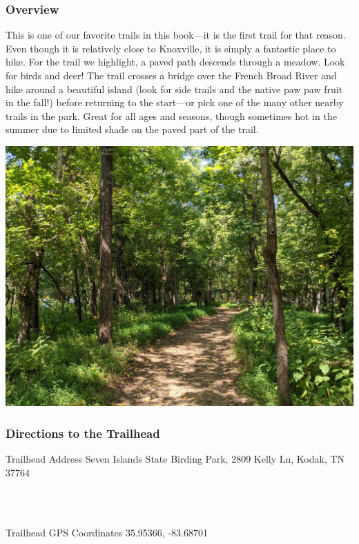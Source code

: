 \documentclass[
  letterpaper,
  DIV=11,
  numbers=noendperiod]{scrartcl}
\begin{document}
\hypertarget{overview}{%
\subsubsection{Overview}\label{overview}}

This is one of our favorite trails in this book---it is the first trail
for that reason. Even though it is relatively close to Knoxville, it is
simply a fantastic place to hike. For the trail we highlight, a paved
path descends through a meadow. Look for birds and deer! The trail
crosses a bridge over the French Broad River and hike around a beautiful
island (look for side trails and the native paw paw fruit in the fall!)
before returning to the start---or pick one of the many other nearby
trails in the park. Great for all ages and seasons, though sometimes hot
in the summer due to limited shade on the paved part of the trail.

\includegraphics{img/trail-01-figure-01.jpg}

\hypertarget{directions-to-the-trailhead}{%
\subsubsection{Directions to the
Trailhead}\label{directions-to-the-trailhead}}

Trailhead Address \textbar{} Seven Islands State Birding Park, 2809
Kelly Ln, Kodak, TN 37764 \textbar{}\\
\strut \\
\strut \\
Trailhead GPS Coordinates \textbar{} 35.95366, -83.68701\\
\strut \\
\end{document}

